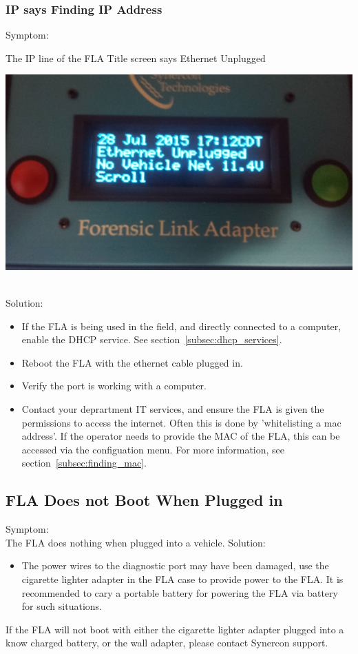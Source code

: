 \documentclass[11pt]{article}
\begin{document}
\subsubsection{IP says Finding IP Address}
Symptom:\\
\noindent\begin{minipage}{0.45\textwidth}%
The IP line of the FLA Title screen says Ethernet Unplugged
\end{minipage}%
\hfill%
\begin{minipage}{0.45\textwidth}
\includegraphics[width=\linewidth]{../media/fla_screens/title_screen_eth_unplug}
\end{minipage}\\
Solution:\\
\begin{itemize}
\item If the FLA is being used in the field, and directly connected to a computer, enable the DHCP service. See section~\ref{subsec:dhcp_services}.
\item Reboot the FLA with the ethernet cable plugged in.
\item Verify the port is working with a computer.
\item Contact your deprartment IT services, and ensure the FLA is given the permissions to access the internet. Often this is done by 'whitelisting a mac address'. If the operator needs to provide the MAC of the FLA, this can be accessed via the configuation menu. For more information, see section~\ref{subsec:finding_mac}.
\end{itemize}
\subsection{FLA Does not Boot When Plugged in}
Symptom:\\
The FLA does nothing when plugged into a vehicle.
Solution:\\
\begin{itemize}
\item The power wires to the diagnostic port may have been damaged, use the cigarette lighter adapter in the FLA case to provide power to the FLA. It is recommended to cary a portable battery for powering the FLA via battery for such situations.
\end{itemize}
If the FLA will not boot with either the cigarette lighter adapter plugged into a know charged battery, or the wall adapter, please contact Synercon support.
\end{document}
